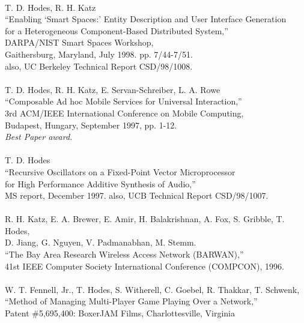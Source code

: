 \begin{tabbing}
\smallskip \\[-3pt]
\>    T. D. Hodes, R. H. Katz \\
\>\>      ``Enabling `Smart Spaces:' Entity Description and User Interface
        Generation \\
\>\>\>     for a Heterogeneous Component-Based Distributed System,'' \\
\>\>       DARPA/NIST Smart Spaces Workshop,  \\
\>\>       Gaithersburg, Maryland, July 1998.  pp. 7/44-7/51.  \\
\>\>       also, UC Berkeley Technical Report CSD/98/1008. \\
\smallskip \\[-3pt]
\>    T. D. Hodes, R. H. Katz, E. Servan-Schreiber, L. A. Rowe \\
\>\>      ``Composable Ad hoc Mobile Services for Universal Interaction,'' \\
\>\>       3rd ACM/IEEE International Conference on Mobile Computing,  \\
\>\>        Budapest, Hungary, September 1997, pp. 1-12. \\
\>\>        {\em Best Paper award. }\\
\smallskip \\[-3pt]
\>    T. D. Hodes \\
\>\>      ``Recursive Oscillators on a Fixed-Point Vector Microprocessor \\
\>\>\>     for High Performance Additive Synthesis of Audio,'' \\
\>\>       MS report, December 1997. also, UCB Technical Report CSD/98/1007. \\
\smallskip \\[-3pt]
\>    R. H. Katz, E. A. Brewer, E. Amir, H. Balakrishnan, A. Fox,
       S. Gribble, T. Hodes, \\
\>\>\>   D. Jiang, G. Nguyen, V. Padmanabhan, M. Stemm. \\
\>\> ``The Bay Area Research Wireless Access Network (BARWAN),''  \\
\>\> 41st IEEE Computer Society International Conference (COMPCON), 1996. \\
\smallskip \\
\>	W. T. Fennell, Jr., T. Hodes, S. Witherell, C. Goebel, 
	R. Thakkar, T. Schwenk, \\
\>\>	``Method of Managing Multi-Player Game Playing Over a Network,''  \\
\>\>	Patent \#5,695,400: BoxerJAM Films, Charlottesville, Virginia 

\end{tabbing}

